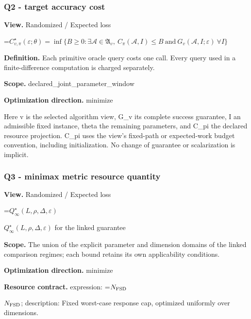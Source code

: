 \documentclass[10pt,a4paper]{article}
\newcommand{\AtlasMath}[1]{\par\begingroup\centering\setbox0=\hbox{$\displaystyle #1$}\ifdim\wd0>1.4\linewidth\typeout{ATLAS WIDE FORMULA: \the\wd0}\fi\ifdim\wd0>\linewidth\resizebox{\linewidth}{!}{\box0}\else\box0\fi\par\endgroup}
\newcommand{\AtlasInlineMath}[1]{\begingroup\setbox0=\hbox{$#1$}\ifdim\wd0>.4\linewidth\endgroup\AtlasMath{#1}\else\endgroup$#1$\fi}
\begin{document}
\subsubsection{Q2 - target accuracy cost}


\textbf{View.} Randomized / Expected loss



\AtlasMath{C^\star_{v,\pi}(\varepsilon;\theta)=\inf\{B\ge0:\exists\mathcal A\in\mathfrak A_v,\ C_\pi(\mathcal A,I)\le B\ \text{and}\ G_v(\mathcal A,I;\varepsilon)\ \forall I\}}


\textbf{Definition.} Each primitive oracle query costs one call. Every query used in a finite-difference computation is charged separately.



\textbf{Scope.} declared\_joint\_parameter\_window



\textbf{Optimization direction.} minimize



Here v is the selected algorithm view, G\_v its complete success guarantee, I an admissible fixed instance, theta the remaining parameters, and C\_pi the declared resource projection. C\_pi uses the view's fixed-path or expected-work budget convention, including initialization. No change of guarantee or scalarization is implicit.



\subsubsection{Q3 - minimax metric resource quantity}


\textbf{View.} Randomized / Expected loss



\AtlasInlineMath{Q^\star_\infty(L,\rho,\Delta,\varepsilon)} for the linked guarantee



\textbf{Scope.} The union of the explicit parameter and dimension domains of the linked comparison regimes; each bound retains its own applicability conditions.



\textbf{Optimization direction.} minimize



\textbf{Resource contract.} expression: \AtlasInlineMath{N_{\rm FSD}}; description: Fixed worst-case response cap, optimized uniformly over dimensions.
\end{document}
